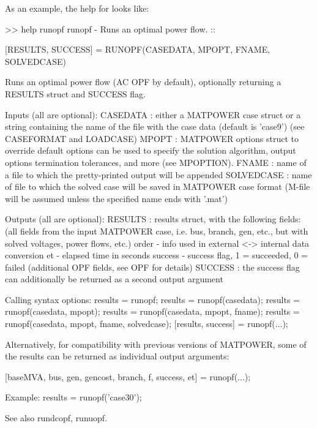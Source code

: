 \documentclass[12pt]{article}
\newcommand{\code}[1]{{\relsize{-0.5}{\tt{{#1}}}}}  %
\numberwithin{equation}{section}
\numberwithin{table}{section}
\numberwithin{figure}{section}
\begin{document}
As an example, the help for \code{runopf} looks like:
\begin{Code}
>> help runopf
  runopf - Runs an optimal power flow.
  ::
 
    [RESULTS, SUCCESS] = RUNOPF(CASEDATA, MPOPT, FNAME, SOLVEDCASE)
 
    Runs an optimal power flow (AC OPF by default), optionally returning
    a RESULTS struct and SUCCESS flag.
 
    Inputs (all are optional):
        CASEDATA : either a MATPOWER case struct or a string containing
            the name of the file with the case data (default is 'case9')
            (see CASEFORMAT and LOADCASE)
        MPOPT : MATPOWER options struct to override default options
            can be used to specify the solution algorithm, output options
            termination tolerances, and more (see MPOPTION).
        FNAME : name of a file to which the pretty-printed output will
            be appended
        SOLVEDCASE : name of file to which the solved case will be saved
            in MATPOWER case format (M-file will be assumed unless the
            specified name ends with '.mat')
 
    Outputs (all are optional):
        RESULTS : results struct, with the following fields:
            (all fields from the input MATPOWER case, i.e. bus, branch,
                gen, etc., but with solved voltages, power flows, etc.)
            order - info used in external <-> internal data conversion
            et - elapsed time in seconds
            success - success flag, 1 = succeeded, 0 = failed
            (additional OPF fields, see OPF for details)
        SUCCESS : the success flag can additionally be returned as
            a second output argument
 
    Calling syntax options:
        results = runopf;
        results = runopf(casedata);
        results = runopf(casedata, mpopt);
        results = runopf(casedata, mpopt, fname);
        results = runopf(casedata, mpopt, fname, solvedcase);
        [results, success] = runopf(...);
 
        Alternatively, for compatibility with previous versions of MATPOWER,
        some of the results can be returned as individual output arguments:
 
        [baseMVA, bus, gen, gencost, branch, f, success, et] = runopf(...);
 
    Example:
        results = runopf('case30');
 
  See also rundcopf, runuopf.
\end{Code}
\end{document}
